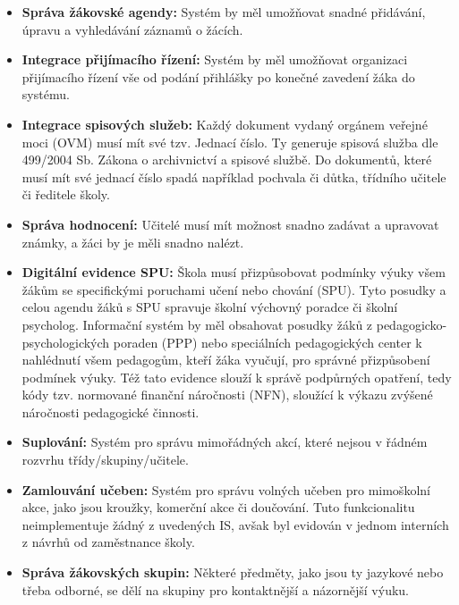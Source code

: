 \documentclass[FM,Proj]{tulthesis}
\begin{document}
\begin{itemize}
    \item \textbf{Správa žákovské agendy:} Systém by měl umožňovat snadné přidávání, úpravu a vyhledávání záznamů o žácích.
    
    \item \textbf{Integrace přijímacího řízení:} Systém by měl umožňovat organizaci přijímacího řízení vše
    od podání přihlášky po konečné zavedení žáka do systému.
    
    \item \textbf{Integrace spisových služeb:} Každý dokument vydaný orgánem veřejné moci (OVM) musí mít své tzv. 
    Jednací číslo. Ty generuje spisová služba dle 499/2004 Sb. Zákona o archivnictví a spisové službě. Do dokumentů, 
    které musí mít své jednací číslo spadá například pochvala či důtka, třídního učitele či ředitele školy.

    \item \textbf{Správa hodnocení:} Učitelé musí mít možnost snadno zadávat a upravovat známky, 
    a žáci by je měli snadno nalézt.

    \item \textbf{Digitální evidence SPU:} Škola musí přizpůsobovat podmínky výuky všem žákům se specifickými poruchami učení
    nebo chování (SPU). Tyto posudky a celou agendu žáků s SPU spravuje školní výchovný poradce či školní psycholog.
    Informační systém by měl obsahovat posudky žáků z pedagogicko-psychologických poraden (PPP) nebo speciálních pedagogických
    center k nahlédnutí všem pedagogům, kteří žáka vyučují, pro správné přizpůsobení podmínek výuky. Též tato evidence
    slouží k správě podpůrných opatření, tedy kódy tzv. normované finanční náročnosti (NFN), sloužící k výkazu zvýšené náročnosti
    pedagogické činnosti.

    \item \textbf{Suplování:} Systém pro správu mimořádných akcí, které nejsou v řádném rozvrhu třídy/skupiny/učitele.
    
    \item \textbf{Zamlouvání učeben:} Systém pro správu volných učeben pro mimoškolní akce, jako jsou kroužky, komerční
    akce či doučování. Tuto funkcionalitu neimplementuje žádný z uvedených IS, avšak byl evidován v jednom
    interních z návrhů od zaměstnance školy.
    
    \item \textbf{Správa žákovských skupin:} Některé předměty, jako jsou ty jazykové nebo třeba odborné, se dělí na skupiny pro 
    kontaktnější a názornější výuku.
    

\end{itemize}
\end{document}
